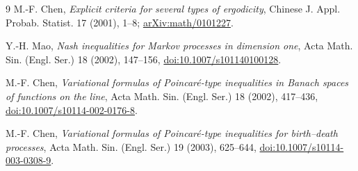 \documentclass[11pt]{article}
\begin{document}
\small
\begin{thebibliography}{9}
M.-F. Chen,
\emph{Explicit criteria for several types of ergodicity},
Chinese J. Appl. Probab. Statist. 17 (2001), 1--8;
\href{https://arxiv.org/abs/math/0101227}{arXiv:math/0101227}.

Y.-H. Mao,
\emph{Nash inequalities for Markov processes in dimension one},
Acta Math. Sin. (Engl. Ser.) 18 (2002), 147--156,
\href{https://doi.org/10.1007/s101140100128}{doi:10.1007/s101140100128}.

M.-F. Chen,
\emph{Variational formulas of Poincar\'e-type inequalities in Banach spaces
of functions on the line},
Acta Math. Sin. (Engl. Ser.) 18 (2002), 417--436,
\href{https://doi.org/10.1007/s10114-002-0176-8}{doi:10.1007/s10114-002-0176-8}.

M.-F. Chen,
\emph{Variational formulas of Poincar\'e-type inequalities for birth--death
processes},
Acta Math. Sin. (Engl. Ser.) 19 (2003), 625--644,
\href{https://doi.org/10.1007/s10114-003-0308-9}{doi:10.1007/s10114-003-0308-9}.
\end{thebibliography}
\normalsize
\end{document}
